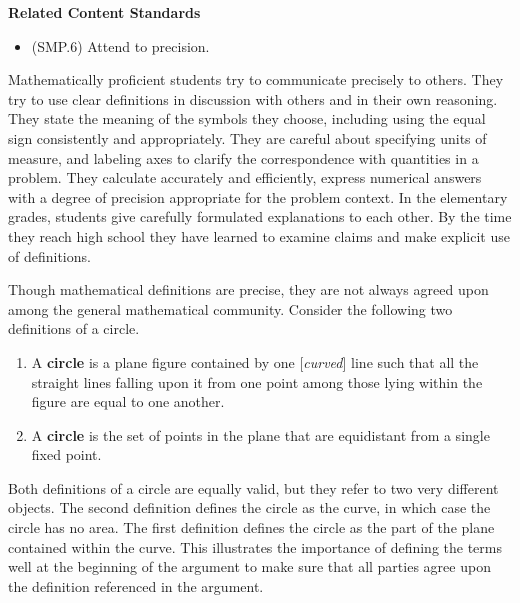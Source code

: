 \documentclass[
]{book}
\providecommand{\tightlist}{%
  \setlength{\itemsep}{0pt}\setlength{\parskip}{0pt}}
\newenvironment{standards}{}{}
\theoremstyle{definition}
\theoremstyle{definition}
\theoremstyle{definition}
\theoremstyle{definition}
\theoremstyle{remark}
\begin{document}
\begin{standards}

\begin{center}
\textbf{Related Content Standards}

\end{center}

\begin{itemize}
\tightlist
\item
  (SMP.6) Attend to precision.
\end{itemize}

Mathematically proficient students try to communicate precisely to others. They try to use clear definitions in discussion with others and in their own reasoning. They state the meaning of the symbols they choose, including using the equal sign consistently and appropriately. They are careful about specifying units of measure, and labeling axes to clarify the correspondence with quantities in a problem. They calculate accurately and efficiently, express numerical answers with a degree of precision appropriate for the problem context. In the elementary grades, students give carefully formulated explanations to each other. By the time they reach high school they have learned to examine claims and make explicit use of definitions.

\end{standards}

Though mathematical definitions are precise, they are not always agreed upon among the general mathematical community. Consider the following two definitions of a circle.

\begin{enumerate}
\def\labelenumi{\arabic{enumi}.}
\tightlist
\item
  A \textbf{circle} is a plane figure contained by one {[}\emph{curved}{]} line such that all the straight lines falling upon it from one point among those lying within the figure are equal to one another.
\item
  A \textbf{circle} is the set of points in the plane that are equidistant from a single fixed point.
\end{enumerate}

Both definitions of a circle are equally valid, but they refer to two very different objects. The second definition defines the circle as the curve, in which case the circle has no area. The first definition defines the circle as the part of the plane contained within the curve. This illustrates the importance of defining the terms well at the beginning of the argument to make sure that all parties agree upon the definition referenced in the argument.
\end{document}
